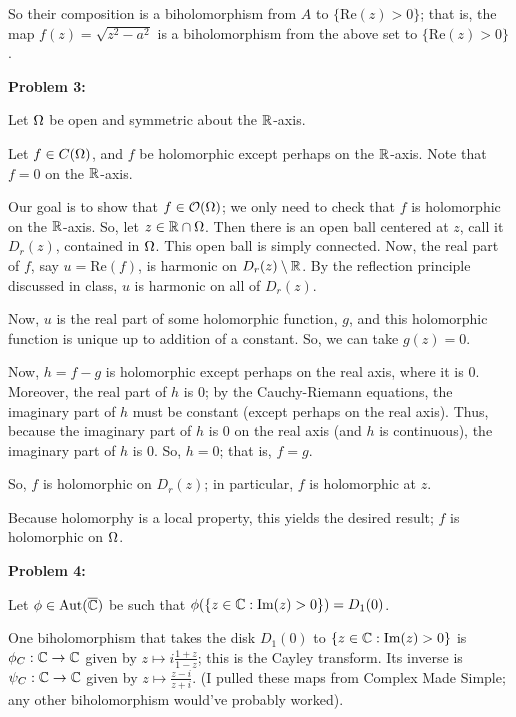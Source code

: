 \documentclass[a4paper,12pt]{article}
\begin{document}
So their composition is a biholomorphism from $A$ to $\{\text{Re}(z) >0\}$; that is, the map $f(z) = \sqrt{z^2-a^2}$ is a biholomorphism from the above set to $\{\text{Re}(z) >0\}$.

\shunt

{\bf Problem 3:}

Let $\Omega$ be open and symmetric about the $\mathbb{R}$-axis.

Let $f \in C(\Omega)$, and $f$ be holomorphic except perhaps on the $\mathbb{R}$-axis. Note that $f=0$ on the $\mathbb{R}$-axis.

Our goal is to show that $f \in \mathcal{O}(\Omega)$; we only need to check that $f$ is holomorphic on the $\mathbb{R}$-axis. So, let $z \in \mathbb{R} \cap \Omega$. Then there is an open ball centered at $z$, call it $D_r(z)$, contained in $\Omega$. This open ball is simply connected. Now, the real part of $f$, say $u = \text{Re}(f)$, is harmonic on $D_r(z) \setminus \mathbb{R}$. By the reflection principle discussed in class, $u$ is harmonic on all of $D_r(z)$.

Now, $u$ is the real part of some holomorphic function, $g$, and this holomorphic function is unique up to addition of a constant. So, we can take $g(z) = 0$. %

Now, $h=f-g$ is holomorphic except perhaps on the real axis, where it is $0$. Moreover, the real part of $h$ is $0$; by the Cauchy-Riemann equations, the imaginary part of $h$ must be constant (except perhaps on the real axis). Thus, because the imaginary part of $h$ is $0$ on the real axis (and $h$ is continuous), the imaginary part of $h$ is $0$. So, $h=0$; that is, $f=g$.

So, $f$ is holomorphic on $D_r(z)$; in particular, $f$ is holomorphic at $z$.

Because holomorphy is a local property, this yields the desired result; $f$ is holomorphic on $\Omega$. 

\shunt

{\bf Problem 4:}

Let $\phi \in \text{Aut}(\overline{\mathbb{C}})$ be such that $\phi(\{z\in \mathbb{C}:\text{Im}(z)>0\}) = D_1(0)$. %

One biholomorphism that takes the disk $D_1(0)$ to $\{z\in \mathbb{C}:\text{Im}(z)>0\}$ is $\phi_C: \mathbb{C} \to \mathbb{C}$ given by $z \mapsto i\frac{1+z}{1-z}$; this is the Cayley transform. Its inverse is $\psi_C: \mathbb{C} \to \mathbb{C}$ given by $z \mapsto \frac{z-i}{z+i}$. (I pulled these maps from Complex Made Simple; any other biholomorphism would've probably worked).
\end{document}
